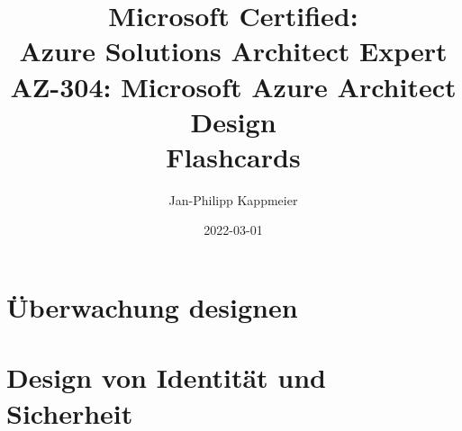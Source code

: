 \documentclass{scrartcl}
\newcommand{\sectioncard}[1]{
    \vspace*{\stretch{1}}
    \section{#1}
    \vspace*{\stretch{1}}
    \pagebreak
}
\begin{document}
    \title{Microsoft Certified:\\Azure Solutions Architect Expert\\\vspace{2mm}AZ-304: Microsoft Azure Architect Design\\Flashcards}
    \date{2022-03-01}
    \author{Jan-Philipp Kappmeier}

    \clearpage\maketitle
    \thispagestyle{empty}
    \pagebreak

    \sectioncard{Überwachung designen}

    
 
    
 
    \sectioncard{Design von Identität und Sicherheit}

    

    

    

    

    

    

    

    

    

    \doclicenseThis
    \pagebreak
\end{document}
